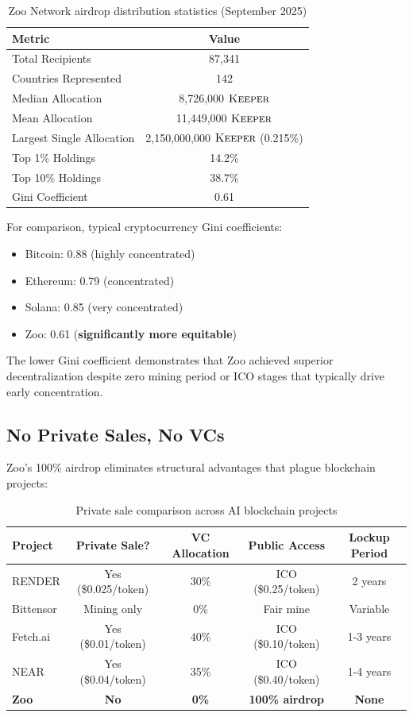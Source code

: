 \begin{table}[h]
\centering
\begin{tabular}{lc}
\toprule
\textbf{Metric} & \textbf{Value} \\
\midrule
Total Recipients & 87,341 \\
Countries Represented & 142 \\
Median Allocation & 8,726,000 $\textsc{Keeper}$ \\
Mean Allocation & 11,449,000 $\textsc{Keeper}$ \\
Largest Single Allocation & 2,150,000,000 $\textsc{Keeper}$ (0.215\%) \\
Top 1\% Holdings & 14.2\% \\
Top 10\% Holdings & 38.7\% \\
Gini Coefficient & 0.61 \\
\bottomrule
\end{tabular}
\caption{Zoo Network airdrop distribution statistics (September 2025)}
\label{tab:airdrop_stats}
\end{table}

For comparison, typical cryptocurrency Gini coefficients:
\begin{itemize}
\item Bitcoin: 0.88 (highly concentrated)
\item Ethereum: 0.79 (concentrated)
\item Solana: 0.85 (very concentrated)
\item Zoo: 0.61 (\textbf{significantly more equitable})
\end{itemize}

The lower Gini coefficient demonstrates that Zoo achieved superior decentralization despite zero mining period or ICO stages that typically drive early concentration.

\subsection{No Private Sales, No VCs}

Zoo's 100\% airdrop eliminates structural advantages that plague blockchain projects:

\begin{table}[h]
\centering
\small
\begin{tabular}{lcccc}
\toprule
\textbf{Project} & \textbf{Private Sale?} & \textbf{VC Allocation} & \textbf{Public Access} & \textbf{Lockup Period} \\
\midrule
RENDER & Yes (\$0.025/token) & 30\% & ICO (\$0.25/token) & 2 years \\
Bittensor & Mining only & 0\% & Fair mine & Variable \\
Fetch.ai & Yes (\$0.01/token) & 40\% & ICO (\$0.10/token) & 1-3 years \\
NEAR & Yes (\$0.04/token) & 35\% & ICO (\$0.40/token) & 1-4 years \\
\textbf{Zoo} & \textbf{No} & \textbf{0\%} & \textbf{100\% airdrop} & \textbf{None} \\
\bottomrule
\end{tabular}
\caption{Private sale comparison across AI blockchain projects}
\label{tab:private_sales}
\end{table}

